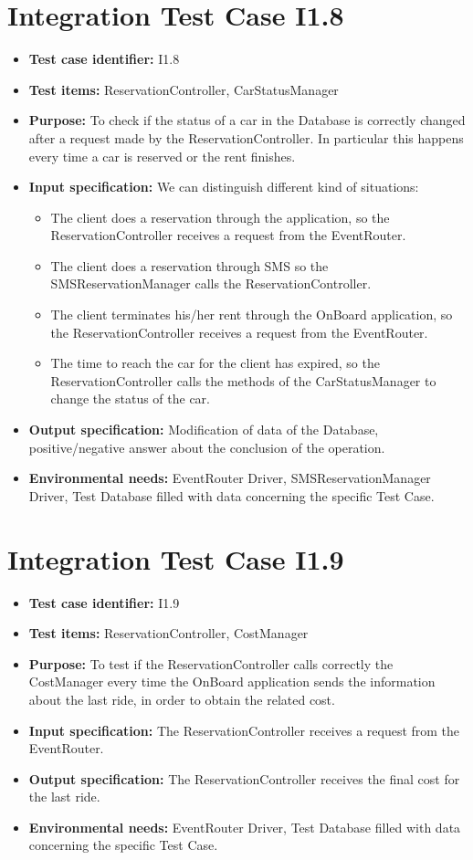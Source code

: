 \section{Integration Test Case I1.8}
\begin{itemize}
\item \textbf{Test case identifier:} I1.8
\item \textbf{Test items:} ReservationController, CarStatusManager
\item \textbf{Purpose:} To check if the status of a car in the Database is correctly changed after a request made by the ReservationController. In particular this happens every time a car is reserved or the rent finishes.
\item \textbf{Input specification:} We can distinguish different kind of situations:
\begin{itemize}
\item The client does a reservation through the application, so the ReservationController receives a request from the EventRouter.
\item The client does a reservation through SMS so the SMSReservationManager calls the ReservationController.
\item The client terminates his/her rent through the OnBoard application, so the ReservationController receives a request from the EventRouter.
\item The time to reach the car for the client has expired, so the ReservationController calls the methods of the CarStatusManager to change the status of the car.
\end{itemize}
\item \textbf{Output specification:} Modification of data of the Database, positive/negative answer about the conclusion of the operation.
\item \textbf{Environmental needs:} EventRouter Driver, SMSReservationManager Driver, Test Database filled with data concerning the specific Test Case.
\end{itemize}

\section{Integration Test Case I1.9}
\begin{itemize}
\item \textbf{Test case identifier:} I1.9
\item \textbf{Test items:} ReservationController, CostManager
\item \textbf{Purpose:} To test if the ReservationController calls correctly the CostManager every time the OnBoard application sends the information about the last ride, in order to obtain the related cost.
\item \textbf{Input specification:} The ReservationController receives a request from the EventRouter.
\item \textbf{Output specification:} The ReservationController receives the final cost for the last ride.
\item \textbf{Environmental needs:} EventRouter Driver,  Test Database filled with data concerning the specific Test Case.
\end{itemize}

